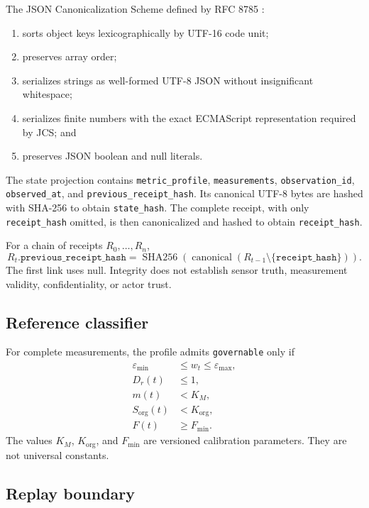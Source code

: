 \documentclass[11pt]{article}
\newcommand{\code}[1]{\texttt{#1}}
\begin{document}
The JSON Canonicalization Scheme defined by RFC 8785 \citep{rfc8785}:
\begin{enumerate}
  \item sorts object keys lexicographically by UTF-16 code unit;
  \item preserves array order;
  \item serializes strings as well-formed UTF-8 JSON without insignificant
        whitespace;
  \item serializes finite numbers with the exact ECMAScript representation
        required by JCS; and
  \item preserves JSON boolean and null literals.
\end{enumerate}

The state projection contains \code{metric\_profile}, \code{measurements},
\code{observation\_id}, \code{observed\_at}, and
\code{previous\_receipt\_hash}. Its canonical UTF-8 bytes are hashed with
SHA-256 to obtain \code{state\_hash}. The complete receipt, with only
\code{receipt\_hash} omitted, is then canonicalized and hashed to obtain
\code{receipt\_hash}.

For a chain of receipts $R_0,\ldots,R_n$,
\begin{equation}
R_t.\code{previous\_receipt\_hash}
=
\operatorname{SHA256}\!\left(
\operatorname{canonical}(R_{t-1}\setminus
\{\code{receipt\_hash}\})
\right).
\label{eq:chain}
\end{equation}
The first link uses null. Integrity does not establish sensor truth,
measurement validity, confidentiality, or actor trust.

\subsection{Reference classifier}

For complete measurements, the profile admits \code{governable} only if
\begin{align}
\varepsilon_{\min}
&\leq w_t\leq\varepsilon_{\max}, \nonumber\\
D_r(t)&\leq1, \nonumber\\
m(t)&<K_M, \nonumber\\
S_{\mathrm{org}}(t)&<K_{\mathrm{org}}, \nonumber\\
F(t)&\geq F_{\min}.
\label{eq:classifier}
\end{align}
The values $K_M$, $K_{\mathrm{org}}$, and $F_{\min}$ are versioned calibration
parameters. They are not universal constants.

\subsection{Replay boundary}
\end{document}
